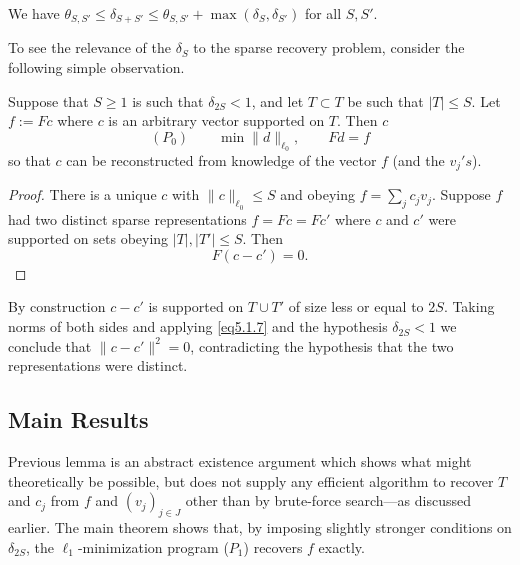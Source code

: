 \begin{lemma}
    We have $\theta_{S,S'} \leq \delta_{S+S'} \leq \theta_{S,S'}+\max(\delta_S,\delta_{S'})$ for all $S,S'$.
    \label{lm5.1.1}
\end{lemma}

To see the relevance of the $\delta_S$ to the sparse recovery problem, consider the following simple observation.
\begin{lemma}
    Suppose that $S \geq 1$ is such that $\delta_{2S} < 1$, and let $T \subset T$ be such that $|T| \leq S$. Let $f:=Fc$ where $c$ is an arbitrary vector supported on $T$. Then $c$
    \begin{equation*}
        (P_0) \qquad \min \|d\|_{\ell_0}, \qquad Fd=f
    \end{equation*}
    so that $c$ can be reconstructed from knowledge of the vector $f$ (and the $v_j's$).
    \label{lm5.1.2}
\end{lemma}
\begin{proof}
    There is a unique $c$ with $\|c\|_{\ell_0} \leq S$ and obeying $f = \sum_{j}c_j v_j$. Suppose $f$ had two distinct sparse representations $f = Fc = Fc'$ where $c$ and $c'$ were supported on sets obeying $|T|,|T'|\leq S$. Then
    \begin{equation*}
        F(c-c')=0.
    \end{equation*}
\end{proof}
By construction $c-c'$ is supported on $T \cup T'$ of size less or equal to $2S$. Taking norms of both sides and applying \cref{eq5.1.7} and the hypothesis $\delta_{2S}<1$ we conclude that $\|c-c'\|^2=0$, contradicting the hypothesis that the two representations were distinct.

\subsection{Main Results}

Previous lemma is an \textcolor[rgb]{1,0,0}{abstract existence argument} which shows what might theoretically be possible, but \textcolor[rgb]{1,0,0}{does not supply any efficient algorithm} to recover $T$ and $c_j$ from $f$ and $(v_j)_{j \in J}$ other than by brute-force search---as discussed earlier. The main theorem shows that, by imposing slightly stronger conditions on $\delta_{2S}$, the $\ell_1$-minimization program ($P_1$) recovers $f$ exactly.

